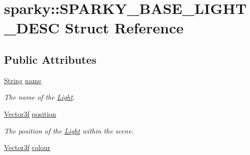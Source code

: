 \hypertarget{structsparky_1_1_s_p_a_r_k_y___b_a_s_e___l_i_g_h_t___d_e_s_c}{}\section{sparky\+:\+:S\+P\+A\+R\+K\+Y\+\_\+\+B\+A\+S\+E\+\_\+\+L\+I\+G\+H\+T\+\_\+\+D\+E\+SC Struct Reference}
\label{structsparky_1_1_s_p_a_r_k_y___b_a_s_e___l_i_g_h_t___d_e_s_c}
\subsection*{Public Attributes}
\begin{DoxyCompactItemize}
\item 
\hyperlink{classsparky_1_1_string}{String} \hyperlink{structsparky_1_1_s_p_a_r_k_y___b_a_s_e___l_i_g_h_t___d_e_s_c_a0b3e29108f714a6004fca8e4a1d6cf67}{name}\hypertarget{structsparky_1_1_s_p_a_r_k_y___b_a_s_e___l_i_g_h_t___d_e_s_c_a0b3e29108f714a6004fca8e4a1d6cf67}{}\label{structsparky_1_1_s_p_a_r_k_y___b_a_s_e___l_i_g_h_t___d_e_s_c_a0b3e29108f714a6004fca8e4a1d6cf67}

\begin{DoxyCompactList}\small\item\em The name of the \hyperlink{classsparky_1_1_light}{Light}. \end{DoxyCompactList}\item 
\hyperlink{classsparky_1_1_vector3}{Vector3f} \hyperlink{structsparky_1_1_s_p_a_r_k_y___b_a_s_e___l_i_g_h_t___d_e_s_c_aed72b3ed8f00100cee86d32063909a48}{position}\hypertarget{structsparky_1_1_s_p_a_r_k_y___b_a_s_e___l_i_g_h_t___d_e_s_c_aed72b3ed8f00100cee86d32063909a48}{}\label{structsparky_1_1_s_p_a_r_k_y___b_a_s_e___l_i_g_h_t___d_e_s_c_aed72b3ed8f00100cee86d32063909a48}

\begin{DoxyCompactList}\small\item\em The position of the \hyperlink{classsparky_1_1_light}{Light} within the scene. \end{DoxyCompactList}\item 
\hyperlink{classsparky_1_1_vector3}{Vector3f} \hyperlink{structsparky_1_1_s_p_a_r_k_y___b_a_s_e___l_i_g_h_t___d_e_s_c_a87e733aa6c7f8cecf430e5d09f424035}{colour}\hypertarget{structsparky_1_1_s_p_a_r_k_y___b_a_s_e___l_i_g_h_t___d_e_s_c_a87e733aa6c7f8cecf430e5d09f424035}{}\label{structsparky_1_1_s_p_a_r_k_y___b_a_s_e___l_i_g_h_t___d_e_s_c_a87e733aa6c7f8cecf430e5d09f424035}


\end{DoxyCompactItemize}
